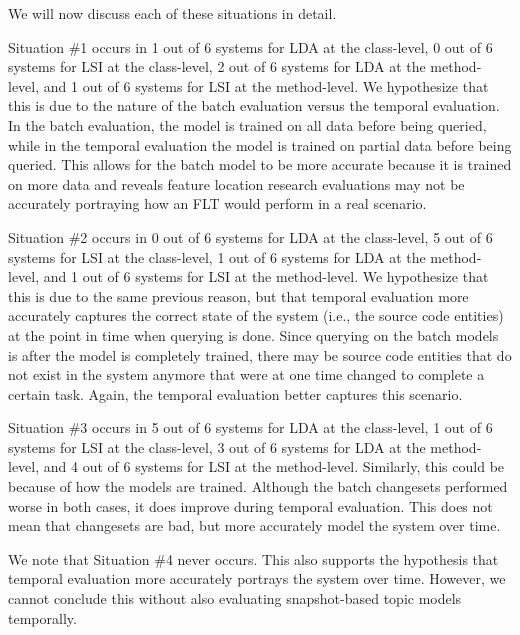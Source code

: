 We will now discuss each of these situations in detail.

%

Situation \#1 occurs in
1 out of 6 systems for LDA at the class-level,
0 out of 6 systems for LSI at the class-level,
2 out of 6 systems for LDA at the method-level,
and 1 out of 6 systems for LSI at the method-level.
We hypothesize that this is due to the nature of the batch evaluation versus the temporal evaluation.
In the batch evaluation, the model is trained on all data before being queried,
while in the temporal evaluation the model is trained on partial data before being queried.
This allows for the batch model to be more accurate because it is trained on more data
and reveals feature location research evaluations may not be accurately portraying
how an FLT would perform in a real scenario.

%

Situation \#2 occurs in
0 out of 6 systems for LDA at the class-level,
5 out of 6 systems for LSI at the class-level,
1 out of 6 systems for LDA at the method-level,
and 1 out of 6 systems for LSI at the method-level.
We hypothesize that this is due to the same previous reason, but that
temporal evaluation more accurately captures the correct state of the system (i.e., the source code entities)
at the point in time when querying is done.
Since querying on the batch models is after the model is completely trained,
there may be source code entities that do not exist in the system anymore
that were at one time changed to complete a certain task.
Again, the temporal evaluation better captures this scenario.

%

Situation \#3 occurs in
5 out of 6 systems for LDA at the class-level,
1 out of 6 systems for LSI at the class-level,
3 out of 6 systems for LDA at the method-level,
and 4 out of 6 systems for LSI at the method-level.
Similarly, this could be because of how the models are trained.
Although the batch changesets performed worse in both cases, it does
improve during temporal evaluation.
This does not mean that changesets are bad, but more accurately model
the system over time.

We note that Situation \#4 never occurs.
This also supports the hypothesis that temporal evaluation more accurately portrays the system over time.
However, we cannot conclude this without also evaluating snapshot-based topic models temporally.
